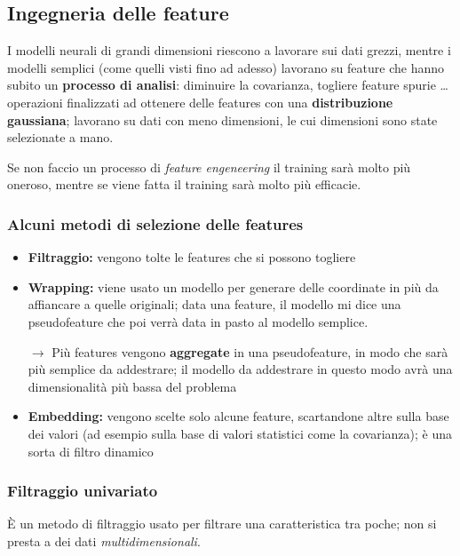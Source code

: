 \documentclass{report}
\begin{document}
\subsection{Ingegneria delle feature}

I modelli neurali di grandi dimensioni riescono a lavorare sui dati grezzi, mentre i modelli semplici (come quelli visti fino ad 
adesso) lavorano su feature che hanno subito un \textbf{processo di analisi}: diminuire la covarianza, togliere feature spurie \dots operazioni 
finalizzati ad ottenere delle features con una \textbf{distribuzione gaussiana}; lavorano su dati con meno dimensioni, le cui dimensioni sono state 
selezionate a mano.

\noindent Se non faccio un processo di \textit{feature engeneering} il training sarà molto più oneroso, mentre se viene fatta il training 
sarà molto più efficacie.

\subsubsection{Alcuni metodi di selezione delle features}

\begin{itemize}
    \item \textbf{Filtraggio:} vengono tolte le features che si possono togliere
    \item \textbf{Wrapping:} viene usato un modello per generare delle coordinate in più da affiancare a quelle originali; data una feature, il modello 
    mi dice una pseudofeature che poi verrà data in pasto al modello semplice.

    $\rightarrow$ Più features vengono \textbf{aggregate} in una pseudofeature, in modo che sarà più semplice da addestrare; il modello da addestrare 
    in questo modo avrà una dimensionalità più bassa del problema
    \item \textbf{Embedding:} vengono scelte solo alcune feature, scartandone altre sulla base dei valori (ad esempio sulla base di valori statistici 
    come la covarianza); è una sorta di filtro dinamico
\end{itemize}

\subsubsection{Filtraggio univariato}
È un metodo di filtraggio usato per filtrare una caratteristica tra poche; non si presta a dei dati \textit{multidimensionali}.
\end{document}
